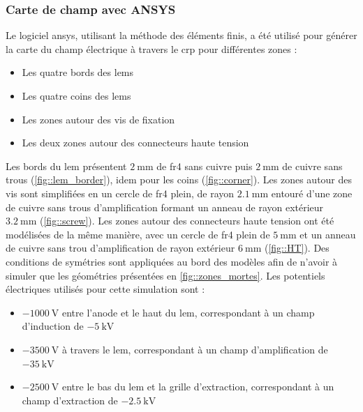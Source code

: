            \subsubsection{Carte de champ avec ANSYS}
            
                Le logiciel \gls{ansys}, utilisant la méthode des éléments finis, a été utilisé pour générer la carte du champ électrique à travers le \gls{crp} pour différentes zones : 
                \begin{itemize}
                    \item Les quatre bords des \glspl{lem}
                    \item Les quatre coins des \glspl{lem}
                    \item Les zones autour des vis de fixation
                    \item Les deux zones autour des connecteurs haute tension
                \end{itemize}
                Les bords du \gls{lem} présentent $\SI{2}{\milli\meter}$ de \gls{fr4} sans cuivre puis $\SI{2}{\milli\meter}$ de cuivre sans trous (\autoref{fig::lem_border}), idem pour les coins (\autoref{fig::corner}). Les zones autour des vis sont simplifiées en un cercle de \gls{fr4} plein, de rayon $\SI{2.1}{\milli\meter}$ entouré d'une zone de cuivre sans trous d'amplification formant un anneau de rayon extérieur $\SI{3.2}{\milli\meter}$ (\autoref{fig::screw}). Les zones autour des connecteurs haute tension ont été modélisées de la même manière, avec un cercle de \gls{fr4} plein de $\SI{5}{\milli\meter}$ et un anneau de cuivre sans trou d'amplification de rayon extérieur $\SI{6}{\milli\meter}$ (\autoref{fig::HT}). Des conditions de symétries sont appliquées au bord des modèles afin de n'avoir à simuler que les géométries présentées en \autoref{fig::zones_mortes}. 
                Les potentiels électriques utilisés pour cette simulation sont : 
                \begin{itemize}
                    \item $\SI{-1000}{\volt}$ entre l'anode et le haut du \gls{lem}, correspondant à un champ d'induction de $\SI{-5}{\kilo\volt}$
                    \item $\SI{-3500}{\volt}$ à travers le \gls{lem}, correspondant à un champ d'amplification de $\SI{-35}{\kilo\volt}$
                    \item $\SI{-2500}{\volt}$ entre le bas du \gls{lem} et la grille d'extraction, correspondant à un champ d'extraction de $\SI{-2.5}{\kilo\volt}$
                \end{itemize}
                
